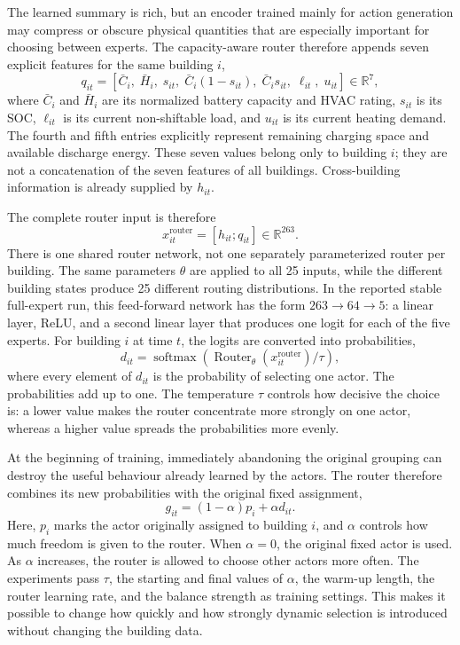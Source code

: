 The learned summary is rich, but an encoder trained mainly for action generation
may compress or obscure physical quantities that are especially important for
choosing between experts. The capacity-aware router therefore appends seven
explicit features for the same building $i$,
\begin{equation}
q_{it}=\left[
\bar C_i,\;\bar H_i,\;s_{it},\;
\bar C_i(1-s_{it}),\;\bar C_i s_{it},\;
\ell_{it},\;u_{it}
\right]\in\mathbb{R}^{7},
\end{equation}
where $\bar C_i$ and $\bar H_i$ are its normalized battery capacity and HVAC
rating, $s_{it}$ is its SOC, $\ell_{it}$ is its current non-shiftable load, and
$u_{it}$ is its current heating demand. The fourth and fifth entries explicitly
represent remaining charging space and available discharge energy. These seven
values belong only to building $i$; they are not a concatenation of the seven
features of all buildings. Cross-building information is already supplied by
$h_{it}$.

The complete router input is therefore
\begin{equation}
x^{\mathrm{router}}_{it}=[h_{it};q_{it}]\in\mathbb{R}^{263}.
\end{equation}
There is one shared router network, not one separately parameterized router per
building. The same parameters $\theta$ are applied to all 25 inputs, while the
different building states produce 25 different routing distributions. In the
reported stable full-expert run, this feed-forward network has the form
$263\rightarrow64\rightarrow5$: a linear layer, ReLU, and a second linear layer
that produces one logit for each of the five experts. For building $i$ at time
$t$, the logits are converted into probabilities,
\begin{equation}
d_{it}=\operatorname{softmax}\!\left(
\operatorname{Router}_{\theta}(x^{\mathrm{router}}_{it})/\tau
\right),
\end{equation}
where every element of $d_{it}$ is the probability of selecting one actor. The
probabilities add up to one. The temperature $\tau$ controls how decisive the
choice is: a lower value makes the router concentrate more strongly on one actor,
whereas a higher value spreads the probabilities more evenly.

At the beginning of training, immediately abandoning the original grouping can
destroy the useful behaviour already learned by the actors. The router therefore
combines its new probabilities with the original fixed assignment,
\begin{equation}
g_{it}=(1-\alpha)p_i+\alpha d_{it}.
\end{equation}
Here, $p_i$ marks the actor originally assigned to building $i$, and $\alpha$
controls how much freedom is given to the router. When $\alpha=0$, the original
fixed actor is used. As $\alpha$ increases, the router is allowed to choose other
actors more often. The experiments pass $\tau$, the starting and final values of
$\alpha$, the warm-up length, the router learning rate, and the balance strength
as training settings. This makes it possible to change how quickly and how
strongly dynamic selection is introduced without changing the building data.

